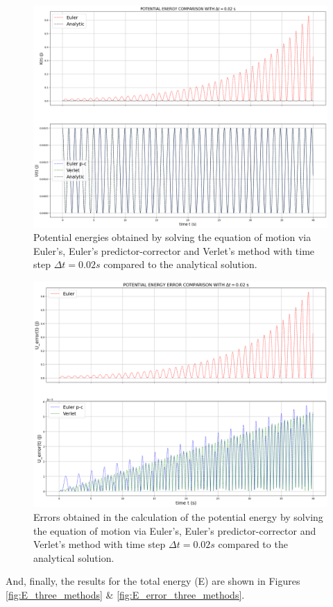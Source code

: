 \documentclass{article}
\begin{document}
\begin{figure}[h!]
 \centering
  \includegraphics[width=0.7\linewidth]{U_eq_motion.png}
  \caption{Potential energies obtained by solving the equation of motion via Euler's, Euler's predictor-corrector and Verlet's method with time step $\Delta t=0.02 s$ compared to the analytical solution.}
  \label{fig:U_three_methods}
\end{figure}
\begin{figure}[h!]
 \centering
  \includegraphics[width=0.7\linewidth]{U_error_eq_motion.png}
  \caption{Errors obtained in the calculation of the potential energy by solving the equation of motion via Euler's, Euler's predictor-corrector and Verlet's method with time step $\Delta t=0.02 s$ compared to the analytical solution.}
  \label{fig:U_error_three_methods}
\end{figure}
And, finally, the results for the total energy (E) are shown in Figures \ref{fig:E_three_methods} \& \ref{fig:E_error_three_methods}.\\
\end{document}
